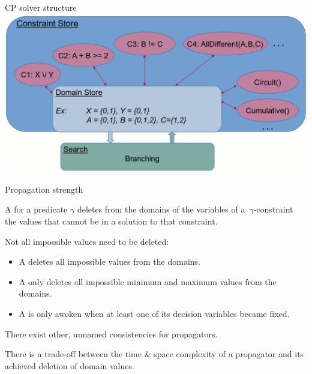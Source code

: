 \documentclass{cons-beamer}
\begin{document}
\begin{frame}{CP solver structure}
  \centering
  \includegraphics[height=70mm]{images/cp_domain_store.png}
\end{frame}

\begin{frame}{Propagation strength}\label{propagator}
  \begin{definition}
    A  for a predicate $\gamma$ deletes from the
    domains of the
    variables of a~$\gamma$-constraint the values that cannot
    be in a solution to that constraint.
    \vfill 

    Not all impossible values need to be deleted:
    \begin{itemize}
      \item A  deletes all
        impossible values from the domains.
      \item A  only deletes
        all impossible minimum and maximum values from the domains.
      \item A  is only awoken
        when at least one of its decision variables became fixed.
    \end{itemize}
  \end{definition}
  \vfill

  There exist other, unnamed consistencies for propagators. \vfill

  There is a trade-off between the time \& space complexity of a
  propagator and its achieved deletion of domain values.
\end{frame}
\end{document}
